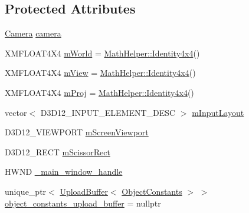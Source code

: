 \subsection*{Protected Attributes}
\begin{DoxyCompactItemize}
\item 
\hyperlink{class_camera}{Camera} \hyperlink{class_direct_x_renderer_aa951dfb1fd582826829d938eaffef28d_aa951dfb1fd582826829d938eaffef28d}{camera}
\item 
X\+M\+F\+L\+O\+A\+T4\+X4 \hyperlink{class_direct_x_renderer_a3a4030d42352ab1e62f5e89f094a0152_a3a4030d42352ab1e62f5e89f094a0152}{m\+World} = \hyperlink{class_math_helper_a68b4e9af95b1a36aad30ea80839f6b19_a68b4e9af95b1a36aad30ea80839f6b19}{Math\+Helper\+::\+Identity4x4}()
\item 
X\+M\+F\+L\+O\+A\+T4\+X4 \hyperlink{class_direct_x_renderer_a0fb814f0d43d2ce2c6bacfd93471e4f6_a0fb814f0d43d2ce2c6bacfd93471e4f6}{m\+View} = \hyperlink{class_math_helper_a68b4e9af95b1a36aad30ea80839f6b19_a68b4e9af95b1a36aad30ea80839f6b19}{Math\+Helper\+::\+Identity4x4}()
\item 
X\+M\+F\+L\+O\+A\+T4\+X4 \hyperlink{class_direct_x_renderer_abebffe15f62df95af83a3d10b1fb4ee8_abebffe15f62df95af83a3d10b1fb4ee8}{m\+Proj} = \hyperlink{class_math_helper_a68b4e9af95b1a36aad30ea80839f6b19_a68b4e9af95b1a36aad30ea80839f6b19}{Math\+Helper\+::\+Identity4x4}()
\item 
vector$<$ D3\+D12\+\_\+\+I\+N\+P\+U\+T\+\_\+\+E\+L\+E\+M\+E\+N\+T\+\_\+\+D\+E\+SC $>$ \hyperlink{class_direct_x_renderer_a9e2123f281f20c29d3d4c40bdf3246b1_a9e2123f281f20c29d3d4c40bdf3246b1}{m\+Input\+Layout}
\item 
D3\+D12\+\_\+\+V\+I\+E\+W\+P\+O\+RT \hyperlink{class_direct_x_renderer_a09101a474a851ed120e597221f35f0e5_a09101a474a851ed120e597221f35f0e5}{m\+Screen\+Viewport}
\item 
D3\+D12\+\_\+\+R\+E\+CT \hyperlink{class_direct_x_renderer_a67085369c1a3832355849292321bf246_a67085369c1a3832355849292321bf246}{m\+Scissor\+Rect}
\item 
H\+W\+ND \hyperlink{class_direct_x_renderer_a85dde4c45dcb539e89d83edec7382c56_a85dde4c45dcb539e89d83edec7382c56}{\+\_\+main\+\_\+window\+\_\+handle}
\item 
unique\+\_\+ptr$<$ \hyperlink{class_upload_buffer}{Upload\+Buffer}$<$ \hyperlink{struct_object_constants}{Object\+Constants} $>$ $>$ \hyperlink{class_direct_x_renderer_ae69d39730c18ec7f8ef2bea3b30cb560_ae69d39730c18ec7f8ef2bea3b30cb560}{object\+\_\+constants\+\_\+upload\+\_\+buffer} = nullptr

\end{DoxyCompactItemize}
